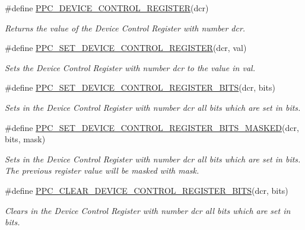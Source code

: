 \begin{DoxyCompactItemize}
\#define \mbox{\hyperlink{group__RTEMSBSPsPowerPCSharedUtility_gaf9d70263b9f91ca4aae512e6d9ac29e3}{P\+P\+C\+\_\+\+D\+E\+V\+I\+C\+E\+\_\+\+C\+O\+N\+T\+R\+O\+L\+\_\+\+R\+E\+G\+I\+S\+T\+ER}}(dcr)
\begin{DoxyCompactList}\small\item\em Returns the value of the Device Control Register with number {\itshape dcr}. \end{DoxyCompactList}\item 
\#define \mbox{\hyperlink{group__RTEMSBSPsPowerPCSharedUtility_ga22216346d9a84013ce035e303c09b9de}{P\+P\+C\+\_\+\+S\+E\+T\+\_\+\+D\+E\+V\+I\+C\+E\+\_\+\+C\+O\+N\+T\+R\+O\+L\+\_\+\+R\+E\+G\+I\+S\+T\+ER}}(dcr,  val)
\begin{DoxyCompactList}\small\item\em Sets the Device Control Register with number {\itshape dcr} to the value in {\itshape val}. \end{DoxyCompactList}\item 
\#define \mbox{\hyperlink{group__RTEMSBSPsPowerPCSharedUtility_ga9ebd69cadb130d05089b0bd98a05a8a7}{P\+P\+C\+\_\+\+S\+E\+T\+\_\+\+D\+E\+V\+I\+C\+E\+\_\+\+C\+O\+N\+T\+R\+O\+L\+\_\+\+R\+E\+G\+I\+S\+T\+E\+R\+\_\+\+B\+I\+TS}}(dcr,  bits)
\begin{DoxyCompactList}\small\item\em Sets in the Device Control Register with number {\itshape dcr} all bits which are set in {\itshape bits}. \end{DoxyCompactList}\item 
\#define \mbox{\hyperlink{group__RTEMSBSPsPowerPCSharedUtility_ga8fb9b2c1dc025622892b8c9532e11315}{P\+P\+C\+\_\+\+S\+E\+T\+\_\+\+D\+E\+V\+I\+C\+E\+\_\+\+C\+O\+N\+T\+R\+O\+L\+\_\+\+R\+E\+G\+I\+S\+T\+E\+R\+\_\+\+B\+I\+T\+S\+\_\+\+M\+A\+S\+K\+ED}}(dcr,  bits,  mask)
\begin{DoxyCompactList}\small\item\em Sets in the Device Control Register with number {\itshape dcr} all bits which are set in {\itshape bits}. The previous register value will be masked with {\itshape mask}. \end{DoxyCompactList}\item 
\#define \mbox{\hyperlink{group__RTEMSBSPsPowerPCSharedUtility_ga086c9a32db91fc63f36fa127e3bd2c48}{P\+P\+C\+\_\+\+C\+L\+E\+A\+R\+\_\+\+D\+E\+V\+I\+C\+E\+\_\+\+C\+O\+N\+T\+R\+O\+L\+\_\+\+R\+E\+G\+I\+S\+T\+E\+R\+\_\+\+B\+I\+TS}}(dcr,  bits)
\begin{DoxyCompactList}\small\item\em Clears in the Device Control Register with number {\itshape dcr} all bits which are set in {\itshape bits}. \end{DoxyCompactList}\end{DoxyCompactItemize}
